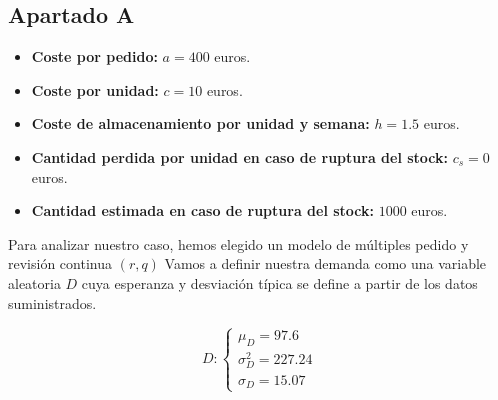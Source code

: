 \documentclass[a4paper,12pt]{article}
\begin{document}

\pagebreak

\subsection{Apartado A}\label{apartadoA}

\begin{itemize}
\item[] \textbf{Coste por pedido:} $a = 400$ euros.
\item[] \textbf{Coste por unidad:} $c = 10$ euros.
\item[] \textbf{Coste de almacenamiento por unidad y semana:} $h = 1.5$ euros.
\item[] \textbf{Cantidad perdida por unidad en caso de ruptura del stock:} $c_s = 0$ euros.
\item[] \textbf{Cantidad estimada en caso de ruptura del stock:} $1000$ euros.
\end{itemize}

Para analizar nuestro caso, hemos elegido un modelo de m\'ultiples pedido y revisi\'on continua $(r,q)$ 
Vamos a definir nuestra demanda como una variable aleatoria $D$ cuya esperanza y desviaci\'on t\'ipica se define a partir de los datos suministrados.


	\begin{equation*}
	D:  \left\lbrace \begin{array}{l}
		\mu_D = 97.6\\
		\sigma_D^2 = 227.24\\
		\sigma_D = 15.07
	\end{array}
	\right. 
	\end{equation*}
\end{document}
